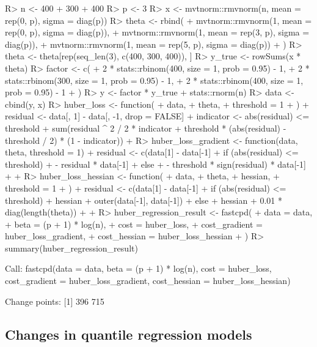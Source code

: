 \documentclass[article]{jss}
\begin{document}
\begin{Schunk}
\begin{Sinput}
R> n <- 400 + 300 + 400
R> p <- 3
R> x <- mvtnorm::rmvnorm(n, mean = rep(0, p), sigma = diag(p))
R> theta <- rbind(
+    mvtnorm::rmvnorm(1, mean = rep(0, p), sigma = diag(p)),
+    mvtnorm::rmvnorm(1, mean = rep(3, p), sigma = diag(p)),
+    mvtnorm::rmvnorm(1, mean = rep(5, p), sigma = diag(p))
+  )
R> theta <- theta[rep(seq_len(3), c(400, 300, 400)), ]
R> y_true <- rowSums(x * theta)
R> factor <- c(
+    2 * stats::rbinom(400, size = 1, prob = 0.95) - 1,
+    2 * stats::rbinom(300, size = 1, prob = 0.95) - 1,
+    2 * stats::rbinom(400, size = 1, prob = 0.95) - 1
+  )
R> y <- factor * y_true + stats::rnorm(n)
R> data <- cbind(y, x)
R> huber_loss <- function(
+    data,
+    theta,
+    threshold = 1
+  ) {
+    residual <- data[, 1] - data[, -1, drop = FALSE] %*% theta
+    indicator <- abs(residual) <= threshold
+    sum(residual ^ 2 / 2 * indicator + threshold * (abs(residual) - threshold / 2) * (1 - indicator))
+  }
R> huber_loss_gradient <- function(data, theta, threshold = 1) {
+    residual <- c(data[1] - data[-1] %*% theta)
+    if (abs(residual) <= threshold) {
+      - residual * data[-1]
+    } else {
+      - threshold * sign(residual) * data[-1]
+    }
+  }
R> huber_loss_hessian <- function(
+    data,
+    theta,
+    hessian,
+    threshold = 1
+  ) {
+    residual <- c(data[1] - data[-1] %*% theta)
+    if (abs(residual) <= threshold) {
+      hessian + outer(data[-1], data[-1])
+    } else {
+      hessian + 0.01 * diag(length(theta))
+    }
+  }
R> huber_regression_result <- fastcpd(
+    data = data,
+    beta = (p + 1) * log(n),
+    cost = huber_loss,
+    cost_gradient = huber_loss_gradient,
+    cost_hessian = huber_loss_hessian
+  )
R> summary(huber_regression_result)
\end{Sinput}
\begin{Soutput}
Call:
fastcpd(data = data, beta = (p + 1) * log(n), cost = huber_loss, 
    cost_gradient = huber_loss_gradient, cost_hessian = huber_loss_hessian)

Change points:
[1] 396 715
\end{Soutput}
\end{Schunk}

\subsection{Changes in quantile regression models} \label{sec:quantile}
\end{document}
